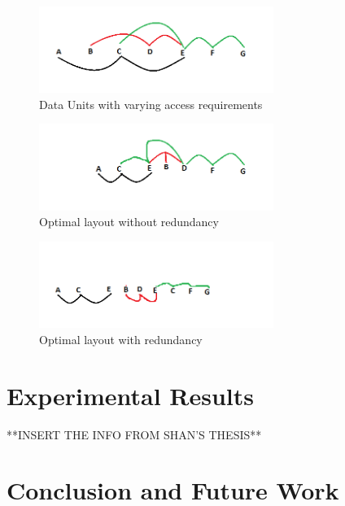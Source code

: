 \documentclass[conference]{acmsiggraph}
\begin{document}
\begin{figure}[ht]
\centering
\includegraphics[width=3in]{examplePic_startingProblem.png}
\caption{Data Units with varying access requirements}
\end{figure}

\begin{figure}[ht]
\centering
\includegraphics[width=3in]{examplePic_woRedundancy.png}
\caption{Optimal layout without redundancy}
\end{figure}

\begin{figure}[ht]
\centering
\includegraphics[width=3in]{examplePic_withRedundancy.png}
\caption{Optimal layout with redundancy}
\end{figure} 

\section{Experimental Results}

**INSERT THE INFO FROM SHAN'S THESIS**


\section{Conclusion and Future Work}
\end{document}
